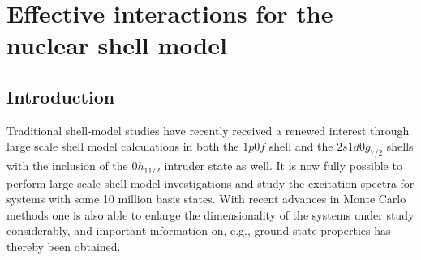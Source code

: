 \chapter{
       Effective interactions for the nuclear shell model
      }

\author{
        M.~Hjorth-Jensen
        }

\address{
         Department of Physics, University of Oslo, Norway
         }

\maketitle



\section{Introduction}


Traditional shell-model studies have recently received a renewed
interest through large scale shell model calculations in both the
$1p0f$ shell and the $2s1d0g_{7/2}$ shells with the inclusion of the
$0h_{11/2}$ intruder state as well.  It is now fully possible to
perform large-scale shell-model investigations and study the
excitation spectra for systems with some 10 million basis states. With
recent advances in Monte Carlo methods one is also able to enlarge the
dimensionality of the systems under study considerably, and important
information on, e.g., ground state properties has thereby been
obtained.

